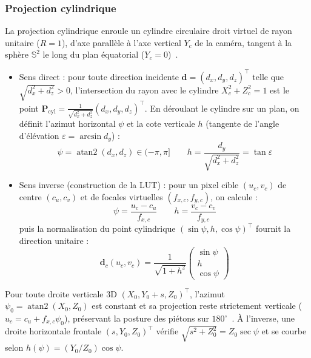 \documentclass[11pt,a4paper]{article}
\renewcommand{\emph}[1]{\textup{#1}}
\begin{document}
\subsubsection{Projection cylindrique}

La projection cylindrique enroule un cylindre circulaire droit virtuel de rayon unitaire ($R = 1$), d'axe parallèle à l'axe vertical $Y_c$ de la caméra, tangent à la sphère $\mathbb{S}^2$ le long du plan équatorial ($Y_c = 0$)~\cite{szeliski1997,lee2026}.
\begin{itemize}
  \item \emph{Sens direct :} pour toute direction incidente $\mathbf{d} = (d_x, d_y, d_z)^\top$ telle que $\sqrt{d_x^2 + d_z^2} > 0$, l'intersection du rayon avec le cylindre $X_c^2 + Z_c^2 = 1$ est le point $\mathbf{P}_{\text{cyl}} = \frac{1}{\sqrt{d_x^2 + d_z^2}}(d_x, d_y, d_z)^\top$. En déroulant le cylindre sur un plan, on définit l'azimut horizontal $\psi$ et la cote verticale $h$ (tangente de l'angle d'élévation $\varepsilon = \arcsin d_y$) :
  \begin{equation}
    \psi = \operatorname{atan2}(d_x, d_z) \in (-\pi, \pi] \qquad
    h = \frac{d_y}{\sqrt{d_x^2 + d_z^2}} = \tan\varepsilon
  \end{equation}
  \item \emph{Sens inverse (construction de la LUT) :} pour un pixel cible $(u_c, v_c)$ de centre $(c_u, c_v)$ et de focales virtuelles $(f_{x,c}, f_{y,c})$, on calcule :
  \begin{equation}
    \psi = \frac{u_c - c_u}{f_{x,c}} \qquad
    h = \frac{v_c - c_v}{f_{y,c}}
  \end{equation}
  puis la normalisation du point cylindrique $(\sin\psi, h, \cos\psi)^\top$ fournit la direction unitaire :
  \begin{equation}
    \mathbf{d}_c(u_c, v_c) = \frac{1}{\sqrt{1+h^2}} \begin{pmatrix} \sin\psi \\ h \\ \cos\psi \end{pmatrix}
  \end{equation}
\end{itemize}

Pour toute droite verticale 3D $(X_0, Y_0+s, Z_0)^\top$, l'azimut $\psi_0 = \operatorname{atan2}(X_0,Z_0)$ est constant et sa projection reste strictement verticale ($u_c = c_u + f_{x,c}\psi_0$), préservant la posture des piétons sur $180^\circ$~\cite{szeliski1997,plaut2021}. À l'inverse, une droite horizontale frontale $(s, Y_0, Z_0)^\top$ vérifie $\sqrt{s^2+Z_0^2} = Z_0\sec\psi$ et se courbe selon $h(\psi) = (Y_0/Z_0)\cos\psi$. 
\end{document}
